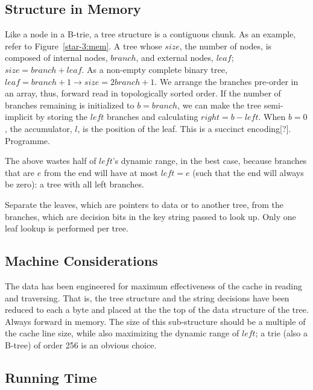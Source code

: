 \documentclass[12pt]{article}
\begin{document}
\subsection{Structure in Memory}

Like a node in a B-trie, a tree structure is a contiguous chunk. As an example, refer to Figure~\ref{star-3:mem}. A tree whose $\mathit{size}$, the number of nodes, is composed of internal nodes, $\mathit{branch}$, and external nodes, $\mathit{leaf}$; $\mathit{size} = \mathit{branch} + \mathit{leaf}$. As a non-empty complete binary tree, $\mathit{leaf} = \mathit{branch} + 1 \rightarrow \mathit{size} = 2\mathit{branch} + 1$. We arrange the branches pre-order in an array, thus, forward read in topologically sorted order. If the number of branches remaining is initialized to $b = \mathit{branch}$, we can make the tree semi-implicit by storing the $\mathit{left}$ branches and calculating $\mathit{right} = b - \mathit{left}$. When $b = 0$, the accumulator, $l$, is the position of the leaf. This is a succinct encoding[?]. Programme.

The above wastes half of $\mathit{left}$'s dynamic range, in the best case, because branches that are $e$ from the end will have at most $\mathit{left} = e$ (such that the end will always be zero): a tree with all left branches.

 Separate the leaves, which are pointers to data or to another tree, from the branches, which are decision bits in the key string passed to look up. Only one leaf lookup is performed per tree.

\subsection{Machine Considerations}

The data has been engineered for maximum effectiveness of the cache in reading and traversing. That is, the tree structure and the string decisions have been reduced to each a byte and placed at the the top of the data structure of the tree. Always forward in memory. The size of this sub-structure should be a multiple of the cache line size, while also maximizing the dynamic range of $\mathit{left}$; a trie (also a B-tree) of order 256 is an obvious choice.\cite{sinha2004cache}

\subsection{Running Time}
\end{document}
